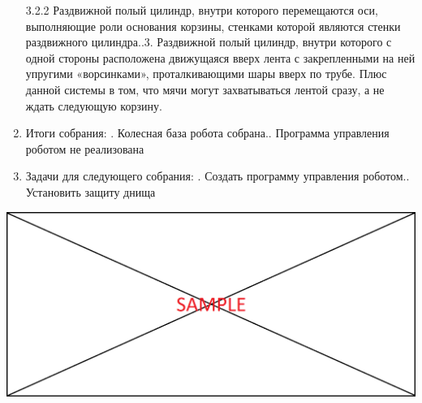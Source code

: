 \documentclass[11pt]{article}
\newcommand\measurepage{\dimexpr\pagegoal-\pagetotal-\baselineskip\relax}
\newcommand\fillpage{\includegraphics[width=\textwidth, height=\measurepage]{img/fill_page}}
\begin{document}
\begin{enumerate}
            3.2.2   Раздвижной полый цилиндр, внутри которого перемещаются оси, выполняющие роли основания корзины, стенками которой являются стенки раздвижного цилиндра..3.   Раздвижной полый цилиндр, внутри которого с одной стороны расположена движущаяся вверх лента с закрепленными на ней упругими «ворсинками», проталкивающими шары вверх по трубе. Плюс данной системы в том, что мячи могут захватываться лентой сразу, а не ждать следующую корзину.
            \newline
            \item Итоги собрания:
            .   Колесная база робота собрана..   Программа управления роботом не реализована
            \newline
            \item Задачи для следующего собрания:
            . Создать программу управления роботом.. Установить защиту днища
            \newline   
         \end{enumerate}

         \fillpage
\end{document}
